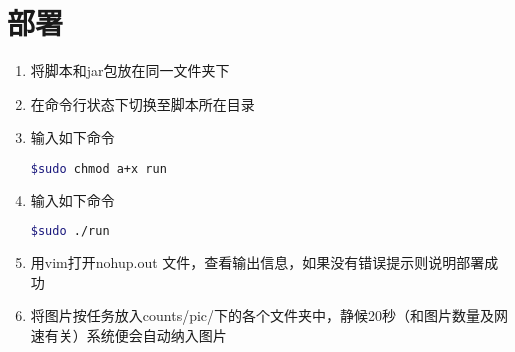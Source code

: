 \documentclass{ctexart}
\begin{document}
\newpage
\section{部署}
\begin{enumerate}
        \item 将脚本和jar包放在同一文件夹下

        \item 在命令行状态下切换至脚本所在目录

        \item 输入如下命令
        \begin{lstlisting}[language=bash]
         $sudo chmod a+x run
        \end{lstlisting}

        \item 输入如下命令
        \begin{lstlisting}[language=bash]
         $sudo ./run
        \end{lstlisting}

        \item 用vim打开nohup.out 文件，查看输出信息，如果没有错误提示则说明部署成功

        \item 将图片按任务放入counts/pic/下的各个文件夹中，静候20秒（和图片数量及网速有关）系统便会自动纳入图片
\end{enumerate}
\end{document}
